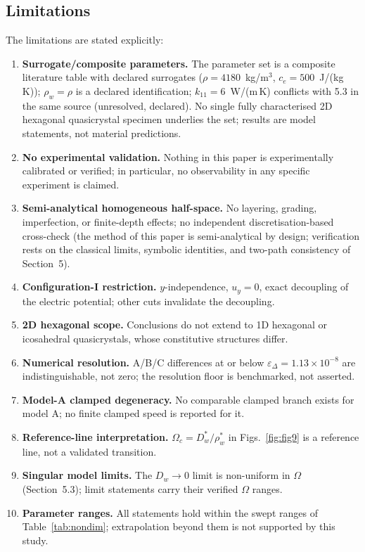 \documentclass[11pt]{article}
\newcommand{\e}{\varepsilon}
\newcommand{\Om}{\Omega}
\newcommand{\Dw}{D_w}
\newcommand{\rw}{\rho_w}
\begin{document}
\subsection{Limitations}

The limitations are stated explicitly:
\begin{enumerate}
\item \textbf{Surrogate/composite parameters.} The parameter set is a composite literature table with declared surrogates ($\rho=4180$~kg/m$^3$, $c_e=500$~J/(kg\,K)); $\rw=\rho$ is a declared identification; $k_{11}=6$~W/(m\,K) conflicts with 5.3 in the same source (unresolved, declared). No single fully characterised 2D hexagonal quasicrystal specimen underlies the set; results are model statements, not material predictions.
\item \textbf{No experimental validation.} Nothing in this paper is experimentally calibrated or verified; in particular, no observability in any specific experiment is claimed.
\item \textbf{Semi-analytical homogeneous half-space.} No layering, grading, imperfection, or finite-depth effects; no independent discretisation-based cross-check (the method of this paper is semi-analytical by design; verification rests on the classical limits, symbolic identities, and two-path consistency of Section~5).
\item \textbf{Configuration-I restriction.} $y$-independence, $u_y=0$, exact decoupling of the electric potential; other cuts invalidate the decoupling.
\item \textbf{2D hexagonal scope.} Conclusions do not extend to 1D hexagonal or icosahedral quasicrystals, whose constitutive structures differ.
\item \textbf{Numerical resolution.} A/B/C differences at or below $\e_\Delta=1.13\times10^{-8}$ are indistinguishable, not zero; the resolution floor is benchmarked, not asserted.
\item \textbf{Model-A clamped degeneracy.} No comparable clamped branch exists for model A; no finite clamped speed is reported for it.
\item \textbf{Reference-line interpretation.} $\Om_c=D_w^*/\rw^*$ in Figs.~\ref{fig:fig9} is a reference line, not a validated transition.
\item \textbf{Singular model limits.} The $\Dw\to0$ limit is non-uniform in $\Om$ (Section~5.3); limit statements carry their verified $\Om$ ranges.
\item \textbf{Parameter ranges.} All statements hold within the swept ranges of Table~\ref{tab:nondim}; extrapolation beyond them is not supported by this study.
\end{enumerate}
\end{document}
